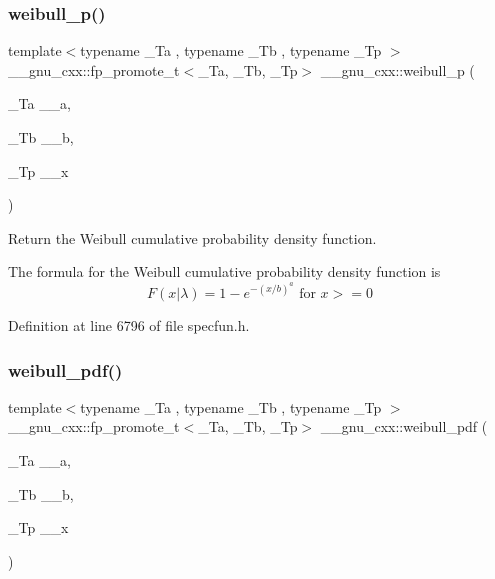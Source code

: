 \subsubsection{\texorpdfstring{weibull\+\_\+p()}{weibull\_p()}}
{\footnotesize\ttfamily template$<$typename \+\_\+\+Ta , typename \+\_\+\+Tb , typename \+\_\+\+Tp $>$ \\
\+\_\+\+\_\+gnu\+\_\+cxx\+::fp\+\_\+promote\+\_\+t$<$\+\_\+\+Ta, \+\_\+\+Tb, \+\_\+\+Tp$>$ \+\_\+\+\_\+gnu\+\_\+cxx\+::weibull\+\_\+p (\begin{DoxyParamCaption}\item[{\+\_\+\+Ta}]{\+\_\+\+\_\+a,  }\item[{\+\_\+\+Tb}]{\+\_\+\+\_\+b,  }\item[{\+\_\+\+Tp}]{\+\_\+\+\_\+x }\end{DoxyParamCaption})\hspace{0.3cm}{\ttfamily [inline]}}



Return the Weibull cumulative probability density function. 

The formula for the Weibull cumulative probability density function is \[ F(x|\lambda) = 1 - e^{-(x / b)^a} \mbox{ for } x >= 0 \] 

Definition at line 6796 of file specfun.\+h.

\mbox{\label{group__mathsf__gnu_gacfbb6ca9df8e0aa092ff4406baff597c}} 
\subsubsection{\texorpdfstring{weibull\+\_\+pdf()}{weibull\_pdf()}}
{\footnotesize\ttfamily template$<$typename \+\_\+\+Ta , typename \+\_\+\+Tb , typename \+\_\+\+Tp $>$ \\
\+\_\+\+\_\+gnu\+\_\+cxx\+::fp\+\_\+promote\+\_\+t$<$\+\_\+\+Ta, \+\_\+\+Tb, \+\_\+\+Tp$>$ \+\_\+\+\_\+gnu\+\_\+cxx\+::weibull\+\_\+pdf (\begin{DoxyParamCaption}\item[{\+\_\+\+Ta}]{\+\_\+\+\_\+a,  }\item[{\+\_\+\+Tb}]{\+\_\+\+\_\+b,  }\item[{\+\_\+\+Tp}]{\+\_\+\+\_\+x }\end{DoxyParamCaption})\hspace{0.3cm}{\ttfamily [inline]}}



